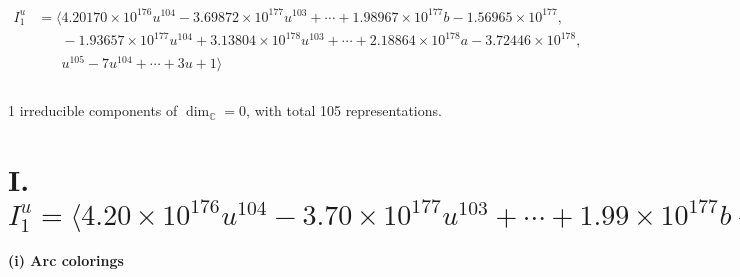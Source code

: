 \documentclass[1p]{elsarticle_modified}
\theoremstyle{definition}
\begin{document}
\begin{align*}
I^u_{1}&=\langle 
4.20170\times10^{176} u^{104}-3.69872\times10^{177} u^{103}+\cdots+1.98967\times10^{177} b-1.56965\times10^{177},\\
\phantom{I^u_{1}}&\phantom{= \langle  }-1.93657\times10^{177} u^{104}+3.13804\times10^{178} u^{103}+\cdots+2.18864\times10^{178} a-3.72446\times10^{178},\\
\phantom{I^u_{1}}&\phantom{= \langle  }u^{105}-7 u^{104}+\cdots+3 u+1\rangle \\
\\
\end{align*}
\raggedright * 1 irreducible components of $\dim_{\mathbb{C}}=0$, with total 105 representations.\\
\newpage
\renewcommand{\arraystretch}{1}
\centering \section*{I. $I^u_{1}= \langle 4.20\times10^{176} u^{104}-3.70\times10^{177} u^{103}+\cdots+1.99\times10^{177} b-1.57\times10^{177},\;-1.94\times10^{177} u^{104}+3.14\times10^{178} u^{103}+\cdots+2.19\times10^{178} a-3.72\times10^{178},\;u^{105}-7 u^{104}+\cdots+3 u+1 \rangle$}
\flushleft \textbf{(i) Arc colorings}\\
\end{document}
